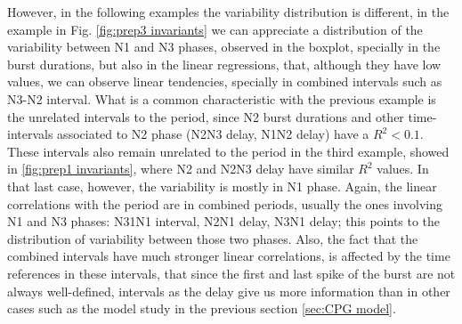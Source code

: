 However, in the following examples the variability distribution is different, in the example in Fig. \ref{fig:prep3 invariants} we can appreciate a distribution of the variability between N1 and N3 phases, observed in the boxplot, specially in the burst durations, but also in the linear regressions, that, although they have low values, we can observe linear tendencies, specially in combined intervals such as N3-N2 interval. What is a common characteristic with the previous example is the unrelated intervals to the period, since N2 burst durations and other time-intervals associated to N2 phase (N2N3 delay, N1N2 delay) have a $R^2 < 0.1$. These intervals also remain unrelated to the period in the third example, showed in \ref{fig:prep1 invariants}, where N2 and N2N3 delay have similar $R^2$ values. In that last case, however, the variability is mostly in N1 phase. Again, the linear correlations with the period are in combined periods, usually the ones involving N1 and N3 phases: N31N1 interval, N2N1 delay, N3N1 delay; this points to the distribution of variability between those two phases. Also, the fact that the combined intervals have much stronger linear correlations, is affected by the time references in these intervals, that since the first and last spike of the burst are not always well-defined, intervals as the delay give us more information than in other cases such as the model study in the previous section \ref{sec:CPG model}.




